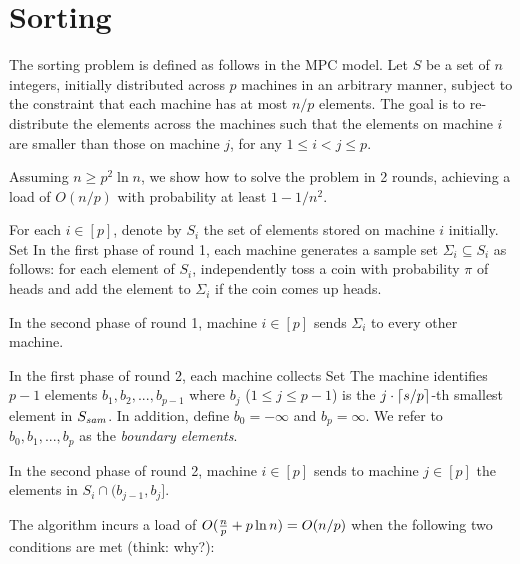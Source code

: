 \section{Sorting} \label{sec:sort}

The sorting problem is defined as follows in the MPC model. Let $S$ be a set of $n$ integers, initially distributed across $p$ machines in an arbitrary manner, subject to the constraint that each machine has at most $n/p$ elements. The goal is to re-distribute the elements across the machines such that the elements on machine $i$ are smaller than those on machine $j$, for any $1 \le i < j \le p$.

\vgap

Assuming $n \ge p^2 \ln n$, we show how to solve the problem in 2 rounds, achieving a load of $O(n/p)$ with probability at least $1 - 1/n^2$.

 For each $i \in [p]$, denote by $S_i$ the set of elements stored on machine $i$ initially. Set
In the first phase of round 1, each machine generates a sample set $\Sigma_i \subseteq S_i$ as follows: for each element of $S_i$, independently toss a coin with probability $\pi$ of heads and add the element to $\Sigma_i$ if the coin comes up heads.

\vgap

In the second phase of round 1, machine $i \in [p]$ sends $\Sigma_i$ to every other machine.

\vgap

In the first phase of round 2, each machine collects
Set
The machine identifies $p - 1$ elements $b_1, b_2, ..., b_{p-1}$ where $b_j$ ($1 \le j \le p-1$) is the $j \cdot \lc s/p \rc$-th smallest element in $S_\mit{sam}$. In addition, define $b_0 = -\infty$ and $b_p = \infty$. We refer to $b_0, b_1, ..., b_p$ as the {\em boundary elements}.

\vgap

In the second phase of round 2, machine $i \in [p]$ sends to machine $j \in [p]$ the elements in $S_i \cap (b_{j-1}, b_j]$.

The algorithm incurs a load of $O(\fr{n}{p} + p \ln n) = O(n/p)$ when the following two conditions are met (think: why?):
\myitems{
    \item {{\bf C1:}} $|\Sigma_i| = O(\ln n)$ for all $i \in [p]$.
	\item {{\bf C2:}} $S \cap (b_{i-1}, b_i]$ has $O(n/p)$ elements for all $i \in [p]$.
}

